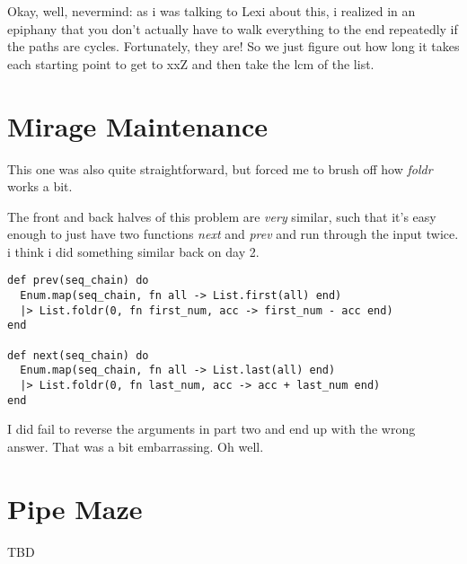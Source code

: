 \documentclass{article}
\begin{document}
Okay, well, nevermind: as i was talking to Lexi about this, i realized in an epiphany that you don't actually have to walk everything to the end repeatedly if the paths are cycles. Fortunately, they are! So we just figure out how long it takes each starting point to get to xxZ and then take the lcm of the list.

\section{Mirage Maintenance}

This one was also quite straightforward, but forced me to brush off how \textit{foldr} works a bit.

The front and back halves of this problem are \textit{very} similar, such that it's easy enough to just have two functions \textit{next} and \textit{prev} and run through the input twice. i think i did something similar back on day 2.

\begin{verbatim}
def prev(seq_chain) do
  Enum.map(seq_chain, fn all -> List.first(all) end)
  |> List.foldr(0, fn first_num, acc -> first_num - acc end)
end

def next(seq_chain) do
  Enum.map(seq_chain, fn all -> List.last(all) end)
  |> List.foldr(0, fn last_num, acc -> acc + last_num end)
end
\end{verbatim}

I did fail to reverse the arguments in part two and end up with the wrong answer. That was a bit embarrassing. Oh well.
\section{Pipe Maze}
TBD
\end{document}
